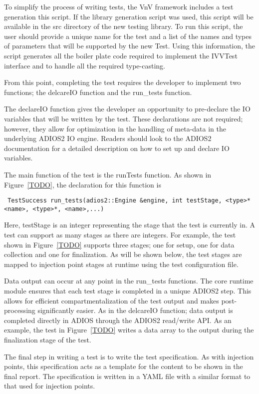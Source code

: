 To simplify the process of writing tests, the VnV framework includes a test generation this script. If the library generation script was used, this script will be available in the src directory of the new testing library. To run this script, the user should provide a unique name for the test and a list of the names and types of parameters that will be supported by the new Test. Using this information, the script generates all the boiler plate code required to implement the IVVTest interface and to handle all the required type-casting. 

From this point, completing the test requires the developer to implement two functions; the delcareIO function and the run_tests function. 

The declareIO function gives the developer an opportunity to pre-declare the IO variables that will be written by the test. These declarations are not required; however, they allow for optimization in the handling of meta-data in the underlying ADIOS2 IO engine. Readers should look to the ADIOS2 documentation for a detailed description on how to set up and declare IO variables. 

The main function of the test is the runTests function. As shown in Figure~\ref{TODO}, the declaration for this function is

\begin{verbatim}
 TestSuccess run_tests(adios2::Engine &engine, int testStage, <type>* <name>, <type>*, <name>,...)
\end{verbatim}

Here, testStage is an integer representing the stage that the test is currently in. A test can support as many stages as there are integers. For example, 
the test shown in Figure~\ref{TODO} supports three stages; one for setup, one for data collection and one for finalization. As will be shown below, the test 
stages are mapped to injection point stages at runtime using the test configuration file. 

Data output can occur at any point in the run_tests functions. The core runtime module ensures that each test stage is completed in a unique ADIOS2 step. This allows for efficient 
compartmentalization of the test output and makes post-processing significantly easier. As in the delcareIO function; data output is completed directly in ADIOS through the 
ADIOS2 read/write API. As an example, the test in Figure~\ref{TODO} writes a data array to the output during the finalization stage of the test. 

The final step in writing a test is to write the test specification. As with injection points, this specification acts as a template for the 
content to be shown in the final report. The specification is written in a YAML file with a similar format to that used for injection points. 


